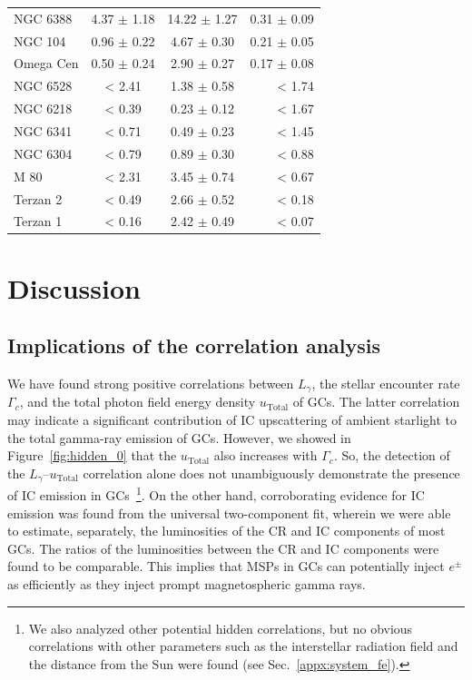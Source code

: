 \documentclass[doublespace,nopageskip]{VTthesis} %
\begin{document}
\begin{table}
\begin{tabular}{lccr}
NGC 6388 & 4.37 $\pm$ 1.18 & 14.22 $\pm$ 1.27 & 0.31 $\pm$ 0.09 \\
NGC 104 & 0.96 $\pm$ 0.22 & 4.67 $\pm$ 0.30 & 0.21 $\pm$ 0.05 \\
Omega Cen & 0.50 $\pm$ 0.24 & 2.90 $\pm$ 0.27 & 0.17 $\pm$ 0.08 \\
NGC 6528 & < 2.41 & 1.38 $\pm$ 0.58 & < 1.74 \\
NGC 6218 & < 0.39  &  0.23 $\pm$ 0.12 & < 1.67 \\
NGC 6341 & < 0.71  &  0.49 $\pm$ 0.23 & < 1.45 \\
NGC 6304 & < 0.79  &  0.89 $\pm$ 0.30 & < 0.88 \\
M 80 & < 2.31  &  3.45 $\pm$ 0.74 & < 0.67 \\
Terzan 2 & < 0.49  &  2.66 $\pm$ 0.52 & < 0.18 \\
Terzan 1 & < 0.16  &  2.42 $\pm$ 0.49 & < 0.07 \\
\bottomrule
    \end{tabular}
    \label{tab:ratio}
\end{table}

\section{Discussion}\label{sec:discussion_GC}

\subsection{Implications of the correlation analysis}

We have found strong positive correlations between $L_\gamma$, the stellar encounter rate $\Gamma_c$, and the total photon field energy density $u_\mathrm{Total}$ of GCs. The latter correlation may indicate a significant contribution of IC upscattering of ambient starlight to the total gamma-ray emission of GCs. However, we showed in Figure~\ref{fig:hidden_0} that the $u_\mathrm{Total}$ also increases with $\Gamma_c$. So, the detection of the $L_\gamma$--$u_\mathrm{Total}$ correlation alone does not unambiguously demonstrate the presence of IC emission in GCs~\footnote{We also analyzed other potential hidden correlations, but no obvious correlations with other parameters such as the interstellar radiation field and the distance from the Sun were found (see Sec.~\ref{appx:system_fe}).}. On the other hand, corroborating evidence for IC emission was found from the universal two-component fit, wherein we were able to estimate, separately, the luminosities of the CR and IC components of most GCs. The ratios of the luminosities between the CR and IC components were found to be comparable. This implies that MSPs in GCs can potentially inject $e^{\pm}$ as efficiently as they inject prompt magnetospheric gamma rays.
\end{document}
